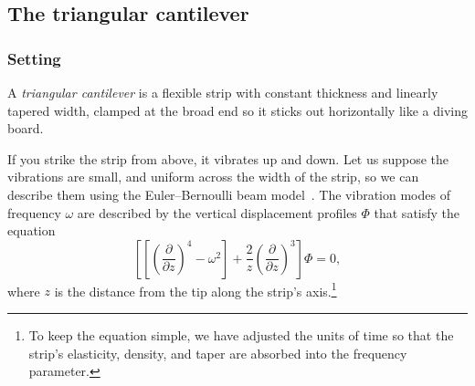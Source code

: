 \documentclass[10pt,a4paper]{amsart}
\numberwithin{equation}{section}
\begin{document}
\subsection{The triangular cantilever}\label{sec:catilever}
%
\subsubsection{Setting}
A {\em triangular cantilever} is a flexible strip with constant thickness and linearly tapered width, clamped at the broad end so it sticks out horizontally like a diving board.
\begin{center}
\end{center}
If you strike the strip from above, it vibrates up and down. Let us suppose the vibrations are small, and uniform across the width of the strip, so we can describe them using the Euler--Bernoulli beam model~\cite[Section 12.4]{genta2009vibration}. The vibration modes of frequency $\omega$ are described by the vertical displacement profiles $\Phi$ that satisfy the equation
\begin{equation}\label{eqn:triangular_cantilever}
 \left[\left[\left(\frac{\partial}{\partial z}\right)^4 - \omega^2\right] + \frac{2}{z}\left(\frac{\partial}{\partial z}\right)^3\right] \Phi = 0,
\end{equation}
where $z$ is the distance from the tip along the strip's axis.\footnote{To keep the equation simple, we have adjusted the units of time so that the strip's elasticity, density, and taper are absorbed into the frequency parameter.}
%
\end{document}
